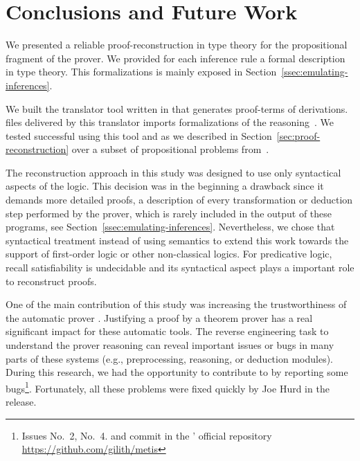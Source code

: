 \documentclass[../main.tex]{subfiles}
\begin{document}

\section{Conclusions and Future Work}
\label{sec:conclusions}

We presented a reliable proof-reconstruction in type theory
for the propositional fragment of the \Metis prover. We provided for
each \Metis inference rule a formal description in type theory.
This formalizations is mainly exposed in
Section~\ref{ssec:emulating-inferences}.

We built the \Athena translator tool written in \Haskell
that generates \Agda proof-terms of \Metis derivations.
\Agda files delivered by this translator imports
\Agda formalizations of the \Metis reasoning~\cite{AgdaProp,AgdaMetis}.
We tested successful using this tool and \Agda as we
described in Section~\ref{sec:proof-reconstruction} over a subset of
propositional problems from~\cite{Prieto-Cubides2017}.

The reconstruction approach in this study was designed to use
only syntactical aspects of the logic.
This decision was in the beginning a drawback
since it demands more detailed proofs, a
description of every transformation or deduction step performed by
the prover, which is rarely included in the output of these programs,
see Section~\ref{ssec:emulating-inferences}.
Nevertheless, we chose that syntactical treatment instead of using
semantics to extend this work towards the support of first-order logic
or other non-classical logics.
For predicative logic, recall satisfiability is undecidable and
its syntactical aspect plays a important role to reconstruct proofs.

One of the main contribution of this study was
increasing the trustworthiness of the automatic prover \Metis.
Justifying a proof by a theorem prover
has a real significant impact for these automatic tools.
The reverse engineering task to understand the prover reasoning
can reveal important issues or bugs
in many parts of these systems (e.g., preprocessing, reasoning, or
deduction modules). During this research, we had the opportunity
to contribute to \Metis by reporting some bugs\footnote{Issues No.~2,
No.~4. and commit  in the \Metis' official repository
\url{https://github.com/gilith/metis}}.
Fortunately, all these problems were fixed quickly by Joe Hurd in
the  release.
\end{document}
